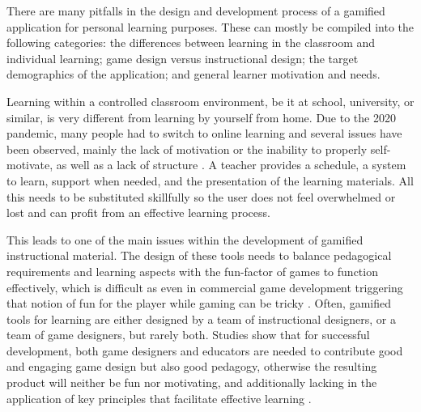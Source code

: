 There are many pitfalls in the design and development process of a gamified application for personal learning purposes. These can mostly be compiled into the following categories: the differences between learning in the classroom and individual learning; game design versus instructional design; the target demographics of the application; and general learner motivation and needs.

Learning within a controlled classroom environment, be it at school, university, or similar, is very different from learning by yourself from home. Due to the 2020 pandemic, many people had to switch to online learning and several issues have been observed, mainly the lack of motivation or the inability to properly self-motivate, as well as a lack of structure \cite{online}. A teacher provides a schedule, a system to learn, support when needed, and the presentation of the learning materials. All this needs to be substituted skillfully so the user does not feel overwhelmed or lost and can profit from an effective learning process.

This leads to one of the main issues within the development of gamified instructional material. The design of these tools needs to balance pedagogical requirements and learning aspects with the fun-factor of games to function effectively, which is difficult as even in commercial game development triggering that notion of fun for the player while gaming can be tricky \cite{online}.
Often, gamified tools for learning are either designed by a team of instructional designers, or a team of game designers, but rarely both. Studies show that for successful development, both game designers and educators are needed to contribute good and engaging game design but also good pedagogy, otherwise the resulting product will neither be fun nor motivating, and additionally lacking in the application of key principles that facilitate effective learning \cite{framework}.

